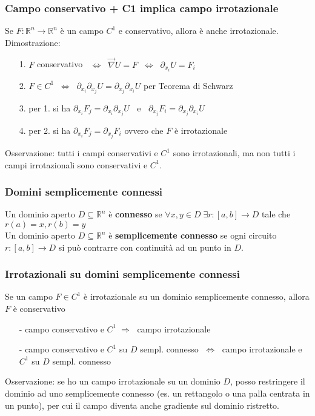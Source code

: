 \documentclass[a4paper]{article}
\newcommand\Rn{\mathbb{R}^n}  %
\newcommand\nab{\vec{\nabla}} %
\begin{document}
\subsubsection*{Campo conservativo + C1 implica campo irrotazionale}
Se \(F: \Rn \to \Rn\) è un campo \(C^1\) e conservativo, allora è anche irrotazionale. \\
Dimostrazione:
\begin{itemize}[topsep=3pt, itemsep=0pt]
	\item[1.] \(F\) conservativo \(\;\; \Leftrightarrow \;\; \nab U = F \;\; \Leftrightarrow \;\; \partial_{x_i}U = F_i\)
	\item[2.] \(F \in C^1 \;\; \Leftrightarrow \;\; \partial_{x_i} \partial_{x_j} U = \partial_{x_j} \partial_{x_i} U\) per Teorema di Schwarz
	\item[3.] per 1. si ha \(\partial_{x_i} F_j = \partial_{x_i} \partial_{x_j} U \;\;\) e \(\;\;\partial_{x_j} F_i = \partial_{x_j} \partial_{x_i} U\)
	\item[4.] per 2. si ha \(\partial_{x_i} F_j = \partial_{x_j} F_i\) ovvero che \(F\) è irrotazionale
\end{itemize}
Osservazione: tutti i campi conservativi e \(C^1\) sono irrotazionali, ma non tutti i campi irrotazionali sono conservativi e \(C^1\).

\subsubsection*{Domini semplicemente connessi}
Un dominio aperto \(D \subseteq \Rn\) è \textbf{connesso} se \(\forall x,y \in D \; \exists r:[a,b] \to D\) tale che \(r(a) = x, r(b) = y\) \\
Un dominio aperto \(D \subseteq \Rn\) è \textbf{semplicemente connesso} se ogni circuito \(r:[a,b] \to D\) si può contrarre con continuità
ad un punto in \(D\).

\subsubsection*{Irrotazionali su domini semplicemente connessi}
Se un campo \(F \in C^1\) è irrotazionale su un dominio semplicemente connesso, allora \(F\) è conservativo
\begin{itemize}[topsep=3pt, itemsep=0pt]
	\item[-] campo conservativo e \(C^1 \; \Rightarrow \;\) campo irrotazionale
	\item[-] campo conservativo e \(C^1\) su \(D\) sempl. connesso \(\; \Leftrightarrow \;\) campo irrotazionale e \(C^1\) su \(D\) sempl. connesso
\end{itemize}
Osservazione: se ho un campo irrotazionale su un dominio \(D\), posso restringere il dominio ad uno semplicemente connesso (es.
un rettangolo o una palla centrata in un punto), per cui il campo diventa anche gradiente sul dominio ristretto.
\end{document}
